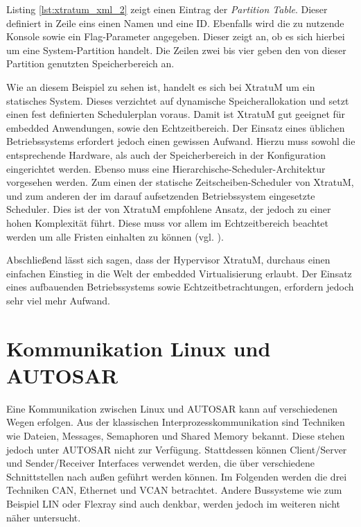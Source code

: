 \documentclass[
  a4paper,					    %
  twoside,
  DIV=calc,     				%
  bibliography=totoc,
  cleardoublepage=empty,
  ngerman,     					%
  final       					%
]{scrbook}
\begin{document}
Listing \ref{lst:xtratum_xml_2} zeigt einen Eintrag der \emph{Partition Table}. Dieser definiert in Zeile eins einen Namen und eine ID. Ebenfalls wird die zu nutzende Konsole sowie ein Flag-Parameter angegeben. Dieser zeigt an, ob es sich hierbei um eine System-Partition handelt. Die Zeilen zwei bis vier geben den von dieser Partition genutzten Speicherbereich an.

Wie an diesem Beispiel zu sehen ist, handelt es sich bei XtratuM um ein statisches System. Dieses verzichtet auf dynamische Speicherallokation und setzt einen fest definierten Schedulerplan voraus. Damit ist XtratuM gut geeignet für embedded Anwendungen, sowie den Echtzeitbereich. Der Einsatz eines üblichen Betriebssystems erfordert jedoch einen gewissen Aufwand. Hierzu muss sowohl die entsprechende Hardware, als auch der Speicherbereich in der Konfiguration eingerichtet werden. Ebenso muss eine Hierarchische-Scheduler-Architektur vorgesehen werden. Zum einen der statische Zeitscheiben-Scheduler von XtratuM, und zum anderen der im darauf aufsetzenden Betriebssystem eingesetzte Scheduler. Dies ist der von XtratuM empfohlene Ansatz, der jedoch zu einer hohen Komplexität führt. Diese muss vor allem im Echtzeitbereich beachtet werden um alle Fristen einhalten zu können (vgl. \cite{two_lvl_sched}).

Abschließend lässt sich sagen, dass der Hypervisor XtratuM, durchaus einen einfachen Einstieg in die Welt der embedded Virtualisierung erlaubt. Der Einsatz eines aufbauenden Betriebssystems sowie Echtzeitbetrachtungen, erfordern jedoch sehr viel mehr Aufwand.






\section{Kommunikation Linux und AUTOSAR}
\label{sec:Kommunikation_L_A}
Eine Kommunikation zwischen Linux und AUTOSAR kann auf verschiedenen Wegen erfolgen. Aus der klassischen Interprozesskommunikation sind Techniken wie Dateien, Messages, Semaphoren und Shared Memory bekannt. Diese stehen jedoch unter AUTOSAR nicht zur Verfügung. Stattdessen können Client/Server und Sender/Receiver Interfaces verwendet werden, die über verschiedene Schnittstellen nach außen geführt werden können. Im Folgenden werden die drei Techniken CAN, Ethernet und VCAN betrachtet. Andere Bussysteme wie zum Beispiel LIN oder Flexray sind auch denkbar, werden jedoch im weiteren nicht näher untersucht.
\end{document}
